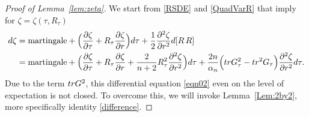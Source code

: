\documentclass[10pt,a4paper]{amsart}
\def\tr{{\rm tr}}
\begin{document}
\begin{proof}[Proof of Lemma~\ref{lem:zeta}] We start from \eqref{RSDE} and \eqref{QuadVarR} that imply for $ \zeta = \zeta ( \tau, R_{ \tau } ) $
%
\begin{align}\label{eqn02} \nonumber
	d \zeta 
	&= \text{martingale} + \Big( \frac{ \partial \zeta }{ \partial \tau } +R_{ \tau }  \frac{ \partial \zeta }{ \partial r } \Big) d \tau 
	+ \frac{ 1 }{ 2 } \frac{ \partial^2 \zeta }{ \partial r^2 } d [ R \, R ] \\
	&= \text{martingale} + \Big( \frac{ \partial \zeta }{ \partial \tau } + R_{ \tau } \frac{ \partial \zeta }{ \partial r } + \frac{ 2 }{ n + 2 } R_{ \tau }^2 \frac{ \partial^2 \zeta }{ \partial r^2 }  \Big) d \tau
	+ \frac{ 2 n }{ \alpha_{ n } } \Big( \tr G_{ \tau }^2 - \tr^2 G_{ \tau } \Big) \frac{ \partial^2 \zeta }{ \partial r^2 } d \tau .
\end{align}
%
Due to the term $\tr  G^2$, this differential equation \eqref{eqn02} even on the level of expectation is not closed. To overcome this, we will invoke Lemma~\ref{Lem:2by2}, more specifically identity \eqref{difference}. 
%


\end{proof}
\end{document}
